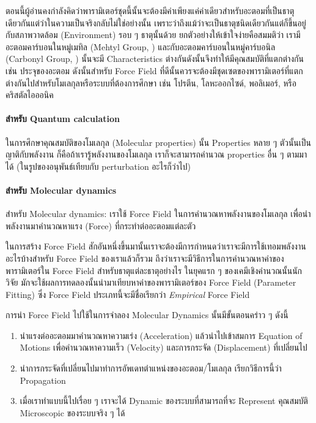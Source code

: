 ตอนนี้ผู้อ่านคงกำลังคิดว่าพารามิเตอร์ชุดนี้นั้นจะต้องมีค่าเพียงแค่ค่าเดียวสำหรับอะตอมที่เป็นธาตุเดียวกันแต่ว่าในความเป็นจริงกลับไม่ใช่อย่างนั้น%
เพราะว่าถึงแม้ว่าจะเป็นธาตุชนิดเดียวกันแต่ก็ขึ้นอยู่กับสภาพวาดล้อม (Environment) รอบ ๆ ธาตุนั้นด้วย ยกตัวอย่างให้เข้าใจง่ายคือสมมติว่า%
เรามีอะตอมคาร์บอนในหมู่เมทิล (Mehtyl Group, ) และกับอะตอมคาร์บอนในหมู่คาร์บอนิล (Carbonyl Group, )
นั้นจะมี Characteristics ต่างกันดังนั้นจึงทำให้มีคุณสมบัติที่แตกต่างกัน เช่น ประจุของอะตอม ดังนั้นสำหรับ Force Field
ที่ดีนั้นควรจะต้องมีชุดเซตของพารามิเตอร์ที่แตกต่างกันไปสำหรับโมเลกุลหรือระบบที่ต้องการศึกษา เช่น โปรตีน, โลหะออกไซด์, พอลิเมอร์, หรือคริสตัลไอออนิค

\paragraph{สำหรับ Quantum calculation}
ในการศึกษาคุณสมบัติของโมเลกุล (Molecular properties) นั้น Properties หลาย ๆ ตัวนั้นเป็นญาติกับพลังงาน ก็คือถ้าเรารู้พลังงานของโมเลกุล เราก็จะสามารถคำนวณ properties อื่น ๆ ตามมาได้ (ในรูปของอนุพันธ์เทียบกับ perturbation อะไรก็ว่าไป)

\paragraph{สำหรับ Molecular dynamics}
สำหรับ Molecular dynamics: เราใช้ Force Field ในการคำนวณหาพลังงานของโมเลกุล เพื่อนำพลังงานมาคำนวณหาแรง (Force) ที่กระทำต่ออะตอมแต่ละตัว

ในการสร้าง Force Field สักอันหนึ่งขึ้นมานั้นเราจะต้องมีการกำหนดว่าเราจะมีการใช้เทอมพลังงานอะไรบ้างสำหรับ Force Field ของเราแล้วก็รวม%
ถึงว่าเราจะมีวิธีการในการคำนวณหาค่าของพารามิเตอร์ใน Force Field สำหรับธาตุแต่ละธาตุอย่างไร ในยุคแรก ๆ ของเคมีเชิงคำนวณนั้นนักวิจัย%
มักจะใช้ผลการทดลองนั้นนำมาเทียบหาค่าของพารามิเตอร์ของ Force Field (Parameter Fitting) ซึ่ง Force Field ประเภทนี้จะมีชื่อเรียกว่า
\textit{Empirical} Force Field

การนำ Force Field ไปใช้ในการจำลอง Molecular Dynamics นั้นมีขั้นตอนคร่าว ๆ ดังนี้

\begin{enumerate}[topsep=0pt,noitemsep]
    \setlength\itemsep{1em}
    \item นำแรงต่ออะตอมมาคำนวณหาความเร่ง (Acceleration) แล้วนำไปเข้าสมการ Equation of Motions
          เพื่อคำนวณหาความเร็ว (Velocity) และการกระจัด (Displacement) ที่เปลี่ยนไป

    \item นำการกระจัดที่เปลี่ยนไปมาทำการอัพเดทตำแหน่งของอะตอม/โมเลกุล เรียกวิธีการนี้ว่า Propagation

    \item เมื่อเราทำแบบนี้ไปเรื่อย ๆ เราจะได้ Dynamic ของระบบที่สามารถที่จะ Represent คุณสมบัติ Microscopic ของระบบจริง ๆ ได้
\end{enumerate}

